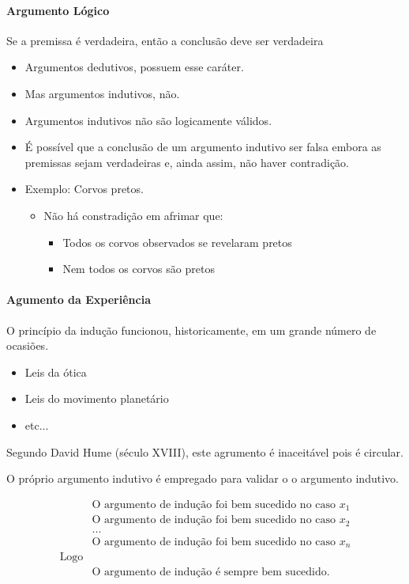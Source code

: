 \documentclass[9pt,a4paper]{extarticle}
\begin{document}
\paragraph{Argumento Lógico}
Se a premissa é verdadeira, então a conclusão deve ser verdadeira
    \begin{itemize}
        \item Argumentos dedutivos, possuem esse caráter.
        \item Mas argumentos indutivos, não.
        \item Argumentos indutivos não são logicamente válidos. 
        \item É possível que a conclusão de um argumento indutivo ser falsa embora as premissas sejam verdadeiras e, ainda assim, não haver contradição. 
        \item Exemplo: Corvos pretos. 
        \begin{itemize}
            \item Não há constradição em afrimar que:
            \begin{itemize}
                \item Todos os corvos observados se revelaram pretos
                \item Nem todos os corvos são pretos
            \end{itemize}
        \end{itemize}
    \end{itemize}

\paragraph{Agumento da Experiência}

O princípio da indução funcionou, historicamente, em um grande número de ocasiões.
\begin{itemize}
    \item Leis da ótica
    \item Leis do movimento planetário
    \item etc...
\end{itemize}

Segundo David Hume (século XVIII), este agrumento é inaceitável pois é circular.

O próprio argumento indutivo é empregado para validar o o argumento indutivo.

\[\begin{aligned}
 & \text{O argumento de indução foi bem sucedido no caso }x_1   \\
 & \text{O argumento de indução foi bem sucedido no caso }x_2    \\
 & ...  \\
 & \text{O argumento de indução foi bem sucedido no caso }x_n   \\ 
\text{Logo} & \\
    & \text{O argumento de indução é sempre bem sucedido. }
\end{aligned} \]
\end{document}
